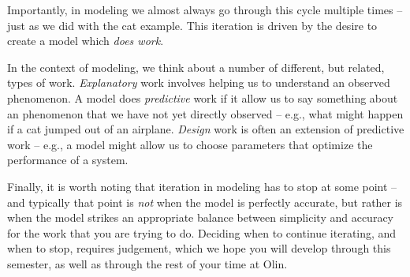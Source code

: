Importantly, in modeling we almost always go through this cycle multiple times -- just as we did with the cat example.  This iteration is driven by the desire to create a model which {\it does work}.   

In the context of modeling, we think about a number of different, but related, types of work.  {\it Explanatory} work involves helping us to understand an observed phenomenon.  A model does {\it predictive} work if it allow us to say something about an phenomenon that we have not yet directly observed -- e.g., what might happen if a cat jumped out of an airplane.  {\it Design} work is often an extension of predictive work -- e.g., a model might allow us to choose parameters that optimize the performance of a system.

Finally, it is worth noting that iteration in modeling has to stop at some point -- and typically that point is {\it not} when the model is perfectly accurate, but rather is when the model strikes an appropriate balance between simplicity and accuracy for the work that you are trying to do.  Deciding when to continue iterating, and when to stop, requires judgement, which we hope you will develop through this semester, as well as through the rest of your time at Olin.

